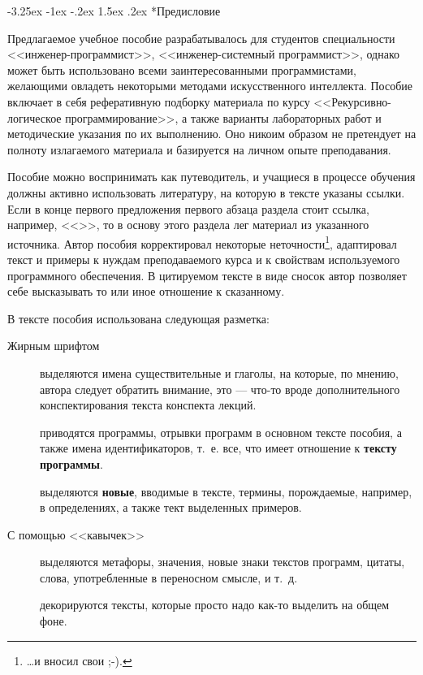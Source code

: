 \documentclass[12pt, openany, twoside]{book} %
\makeatletter
\renewcommand\section{\@startsection {section}{1}{\z@}%
                                   {-3.25ex \@plus -1ex \@minus -.2ex}%
                                   {1.5ex \@plus.2ex}%
                                   {\normalfont\large\bfseries}}
\makeatother
\begin{document}
\newpage
\section*{Предисловие}
\thispagestyle{empty}

Предлагаемое учебное пособие разрабатывалось для студентов специальности <<инженер-программист>>, <<инженер-системный программист>>, однако может быть использовано всеми заинтересованными программистами, желающими овладеть некоторыми методами искусственного интеллекта. Пособие включает в себя рефе\-ра\-тив\-ную подборку материала по курсу <<Рекурсивно-логическое программирование>>, а также варианты лабораторных работ и методические указания по их выполнению. Оно никоим образом не претендует на полноту излагаемого материала и базируется на личном опыте преподавания.

Пособие можно воспринимать как путеводитель, и учащиеся в процессе обучения должны активно использовать литературу, на которую в тексте указаны ссылки. Если в конце первого предложения первого абзаца раздела стоит ссылка, например, <<\cite{AIDictionary}>>, то в основу этого раздела лег материал из указанного источника. Автор пособия корректировал некоторые неточности\footnote{\ldots и вносил свои ;-).}, адаптировал текст и примеры к нуждам преподаваемого курса и к свойствам используемого программного обеспечения. В цитируемом тексте в виде сносок автор позволяет себе высказывать то или иное отношение к сказанному.

В тексте пособия использована следующая разметка:
\begin{description}
\item[Жирным шрифтом] выделяются имена существительные и глаголы, на которые, по мнению, автора следует обратить внимание, это --- что-то вроде дополнительного конспектирования текста конспекта лекций.
\item[] приводятся программы, отрывки программ в основном тексте пособия, а также имена идентификаторов, т.~е. все, что имеет отношение к {\bf тексту программы}.
\item[] выделяются {\bf новые}, вводимые в тексте, термины, порождаемые, например, в определениях, а также тект выделенных примеров.
\item[\normalfont С помощью <<кавычек>>] выделяются метафоры, значения, новые знаки текстов программ, цитаты, слова,
употребленные в переносном смысле, и т.~д.
\item[] декориру\-ют\-ся тексты, которые просто надо как-то выделить на общем фоне.
\end{description}
\end{document}
